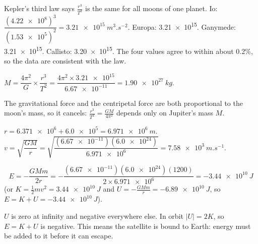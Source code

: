 \documentclass[12pt]{article}
\begin{document}
\ansq
{}
\begin{crit}
\end{crit}
\sample
Kepler's third law says $\frac{r^3}{T^2}$ is the same for all moons of one planet.
Io: $\dfrac{(\num{4.22e8})^3}{(\num{1.53e5})^2} = \qty{3.21e15}{m^3.s^{-2}}$. Europa: \num{3.21e15}.
Ganymede: \num{3.21e15}. Callisto: \num{3.20e15}. The four values agree to within about 0.2\%, so
the data are consistent with the law.
\begin{crit}
\end{crit}
\sample
$M = \dfrac{4\pi^2}{G} \times \dfrac{r^3}{T^2} = \dfrac{4\pi^2 \times \num{3.21e15}}{\num{6.67e-11}}
= \qty{1.90e27}{kg}$.
\begin{crit}
\end{crit}
\sample
The gravitational force and the centripetal force are both proportional to the moon's mass, so it
cancels: $\frac{r^3}{T^2} = \frac{GM}{4\pi^2}$ depends only on Jupiter's mass $M$.

\ansq
{}
\begin{crit}
\end{crit}
\sample
$r = \num{6.371e6} + \num{6.0e5} = \qty{6.971e6}{m}$.
$v = \sqrt{\dfrac{GM}{r}} = \sqrt{\dfrac{(\num{6.67e-11})(\num{6.0e24})}{\num{6.971e6}}} = \qty{7.58e3}{m.s^{-1}}$.
\begin{crit}
\end{crit}
\sample
\[ E = -\frac{GMm}{2r} = -\frac{(\num{6.67e-11})(\num{6.0e24})(1200)}{2 \times \num{6.971e6}} = \qty{-3.44e10}{J} \]
(or $K = \frac{1}{2}mv^2 = \qty{3.44e10}{J}$ and $U = -\frac{GMm}{r} = \qty{-6.89e10}{J}$, so
$E = K + U = \qty{-3.44e10}{J}$).
\begin{crit}
\end{crit}
\sample
$U$ is zero at infinity and negative everywhere else. In orbit $|U| = 2K$, so $E = K + U$ is
negative. This means the satellite is bound to Earth: energy must be added to it before it can
escape.
\end{document}
